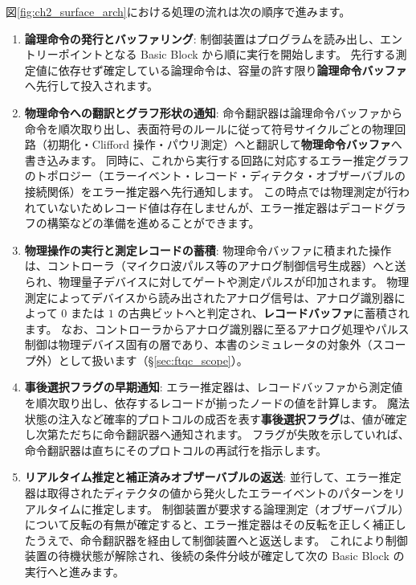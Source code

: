 図\ref{fig:ch2_surface_arch}における処理の流れは次の順序で進みます。
\begin{enumerate}
  \item \textbf{論理命令の発行とバッファリング}:
    制御装置はプログラムを読み出し、エントリーポイントとなる Basic Block から順に実行を開始します。
    先行する測定値に依存せず確定している論理命令は、容量の許す限り\textbf{論理命令バッファ}へ先行して投入されます。
  \item \textbf{物理命令への翻訳とグラフ形状の通知}:
    命令翻訳器は論理命令バッファから命令を順次取り出し、表面符号のルールに従って符号サイクルごとの物理回路（初期化・Clifford 操作・パウリ測定）へと翻訳して\textbf{物理命令バッファ}へ書き込みます。
    同時に、これから実行する回路に対応するエラー推定グラフのトポロジー（エラーイベント・レコード・ディテクタ・オブザーバブルの接続関係）をエラー推定器へ先行通知します。
    この時点では物理測定が行われていないためレコード値は存在しませんが、エラー推定器はデコードグラフの構築などの準備を進めることができます。
  \item \textbf{物理操作の実行と測定レコードの蓄積}:
    物理命令バッファに積まれた操作は、コントローラ（マイクロ波パルス等のアナログ制御信号生成器）へと送られ、物理量子デバイスに対してゲートや測定パルスが印加されます。
    物理測定によってデバイスから読み出されたアナログ信号は、アナログ識別器によって $0$ または $1$ の古典ビットへと判定され、\textbf{レコードバッファ}に蓄積されます。
    なお、コントローラからアナログ識別器に至るアナログ処理やパルス制御は物理デバイス固有の層であり、本書のシミュレータの対象外（スコープ外）として扱います（§\ref{sec:ftqc_scope}）。
  \item \textbf{事後選択フラグの早期通知}:
    エラー推定器は、レコードバッファから測定値を順次取り出し、依存するレコードが揃ったノードの値を計算します。
    魔法状態の注入など確率的プロトコルの成否を表す\textbf{事後選択フラグ}は、値が確定し次第ただちに命令翻訳器へ通知されます。
    フラグが失敗を示していれば、命令翻訳器は直ちにそのプロトコルの再試行を指示します。
  \item \textbf{リアルタイム推定と補正済みオブザーバブルの返送}:
    並行して、エラー推定器は取得されたディテクタの値から発火したエラーイベントのパターンをリアルタイムに推定します。
    制御装置が要求する論理測定（オブザーバブル）について反転の有無が確定すると、エラー推定器はその反転を正しく補正したうえで、命令翻訳器を経由して制御装置へと返送します。
    これにより制御装置の待機状態が解除され、後続の条件分岐が確定して次の Basic Block の実行へと進みます。
\end{enumerate}


